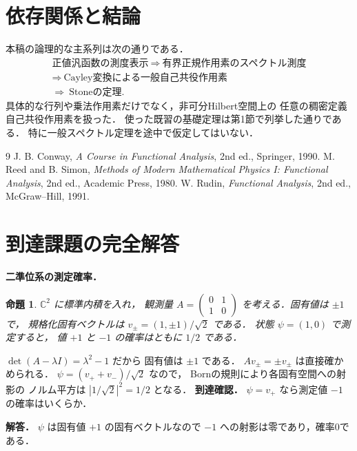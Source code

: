 \documentclass[a5paper,10pt,onecolumn]{jsarticle}
\makeatletter
\theoremstyle{mathnotetheorem}
\newtheorem{proposition}[theorem]{命題}
\renewcommand{\proofname}{証明}
\renewenvironment{proof}[1][\proofname]{%
  \par\pushQED{\qed}\normalfont\topsep4\p@\@plus2\p@\relax
  \trivlist\item[\hskip\labelsep\bfseries #1]\ignorespaces
}{\popQED\endtrivlist\@endpefalse}
\makeatother
\begin{document}
\section{依存関係と結論}
本稿の論理的な主系列は次の通りである．
\[
 \begin{gathered}
 \text{正値汎函数の測度表示}\ \Longrightarrow\
 \text{有界正規作用素のスペクトル測度}\\
 \Longrightarrow\ \text{Cayley変換による一般自己共役作用素}\\
 \Longrightarrow\ \text{Stoneの定理}.
 \end{gathered}
\]
具体的な行列や乗法作用素だけでなく，非可分Hilbert空間上の
任意の稠密定義自己共役作用素を扱った．
使った既習の基礎定理は第1節で列挙した通りである．
特に一般スペクトル定理を途中で仮定してはいない．

\begin{thebibliography}{9}
 J. B. Conway, \emph{A Course in Functional Analysis},
 2nd ed., Springer, 1990.
 M. Reed and B. Simon,
 \emph{Methods of Modern Mathematical Physics I: Functional Analysis},
 2nd ed., Academic Press, 1980.
 W. Rudin, \emph{Functional Analysis},
 2nd ed., McGraw--Hill, 1991.
\end{thebibliography}


\section{到達課題の完全解答}
\noindent\textbf{二準位系の測定確率．}
\begin{proposition}
$\mathbb C^2$ に標準内積を入れ，
観測量
$A=\left(\begin{smallmatrix}0&1\\1&0\end{smallmatrix}\right)$
を考える．固有値は $\pm1$ で，
規格化固有ベクトルは
$v_\pm=(1,\pm1)/\sqrt2$ である．
状態 $\psi=(1,0)$ で測定すると，
値 $+1$ と $-1$ の確率はともに $1/2$ である．
\end{proposition}
\begin{proof}
$\det(A-\lambda I)=\lambda^2-1$ だから
固有値は $\pm1$ である．
$Av_\pm=\pm v_\pm$ は直接確かめられる．
$\psi=(v_++v_-)/\sqrt2$ なので，
Bornの規則により各固有空間への射影の
ノルム平方は $|1/\sqrt2|^2=1/2$ となる．
\end{proof}
\noindent\textbf{到達確認．}
$\psi=v_+$ なら測定値 $-1$ の確率はいくらか．
\par\noindent\textbf{解答．}
$\psi$ は固有値 $+1$ の固有ベクトルなので
$-1$ への射影は零であり，確率0である．
\end{document}
